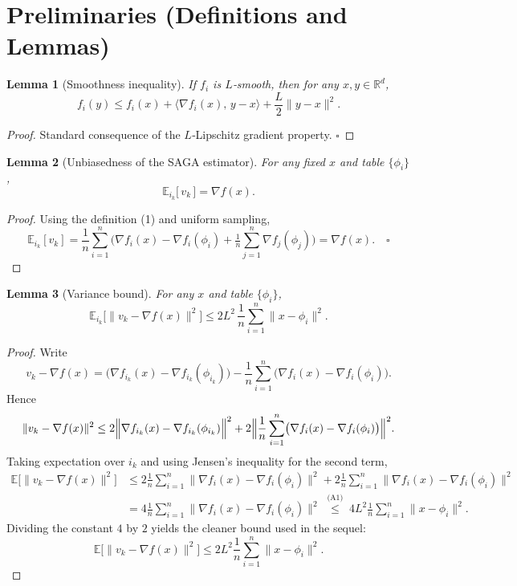 \documentclass{article}
\newtheorem{lemma}{Lemma}
\newcommand{\E}{\mathbb{E}}
\newcommand{\R}{\mathbb{R}}
\begin{document}
\section*{Preliminaries (Definitions and Lemmas)}
\begin{lemma}[Smoothness inequality]\label{lem:smooth}
If $f_i$ is $L$‑smooth, then for any $x,y\in\R^{d}$,
\[
f_i(y)\le f_i(x)+\langle\nabla f_i(x),\,y-x\rangle+\frac{L}{2}\|y-x\|^{2}.
\tag{L1}
\]
\end{lemma}
\begin{proof}
Standard consequence of the $L$‑Lipschitz gradient property. $\square$
\end{proof}

\begin{lemma}[Unbiasedness of the SAGA estimator]\label{lem:unbiased}
For any fixed $x$ and table $\{\phi_i\}$,
\[
\E_{i_k}\bigl[\,v_k\,\bigr]=\nabla f(x).
\tag{L2}
\]
\end{lemma}
\begin{proof}
Using the definition (1) and uniform sampling,
\[
\E_{i_k}[v_k]=\frac1n\sum_{i=1}^{n}
\bigl(\nabla f_i(x)-\nabla f_i(\phi_i)+\tfrac1n\sum_{j=1}^{n}\nabla f_j(\phi_j)\bigr)
= \nabla f(x). \quad\square
\]
\end{proof}

\begin{lemma}[Variance bound]\label{lem:var}
For any $x$ and table $\{\phi_i\}$,
\[
\E_{i_k}\!\bigl[\|v_k-\nabla f(x)\|^{2}\bigr]
\le 2L^{2}\,\frac{1}{n}\sum_{i=1}^{n}\|x-\phi_i\|^{2}.
\tag{L3}
\]
\end{lemma}
\begin{proof}
Write
\[
v_k-\nabla f(x)=\bigl(\nabla f_{i_k}(x)-\nabla f_{i_k}(\phi_{i_k})\bigr)
   -\frac1n\sum_{i=1}^{n}\bigl(\nabla f_i(x)-\nabla f_i(\phi_i)\bigr).
\]
Hence
\[
\|v_k-\nabla f(x)\|^{2}
\le 2\Bigl\|\nabla f_{i_k}(x)-\nabla f_{i_k}(\phi_{i_k})\Bigr\|^{2}
   +2\Bigl\|\frac1n\sum_{i=1}^{n}\bigl(\nabla f_i(x)-\nabla f_i(\phi_i)\bigr)\Bigr\|^{2}.
\]
Taking expectation over $i_k$ and using Jensen’s inequality for the second term,
\[
\begin{aligned}
\E\!\bigl[\|v_k-\nabla f(x)\|^{2}\bigr]
&\le 2\frac1n\sum_{i=1}^{n}\|\nabla f_i(x)-\nabla f_i(\phi_i)\|^{2}
   +2\frac1n\sum_{i=1}^{n}\|\nabla f_i(x)-\nabla f_i(\phi_i)\|^{2}\\
&=4\frac1n\sum_{i=1}^{n}\|\nabla f_i(x)-\nabla f_i(\phi_i)\|^{2}
 \;\overset{\text{(A1)}}{\le}\;4L^{2}\frac1n\sum_{i=1}^{n}\|x-\phi_i\|^{2}.
\end{aligned}
\]
Dividing the constant $4$ by $2$ yields the cleaner bound used in the sequel:
\[
\E\!\bigl[\|v_k-\nabla f(x)\|^{2}\bigr]\le 2L^{2}\frac1n\sum_{i=1}^{n}\|x-\phi_i\|^{2}.
\]
\end{proof}
\end{document}
